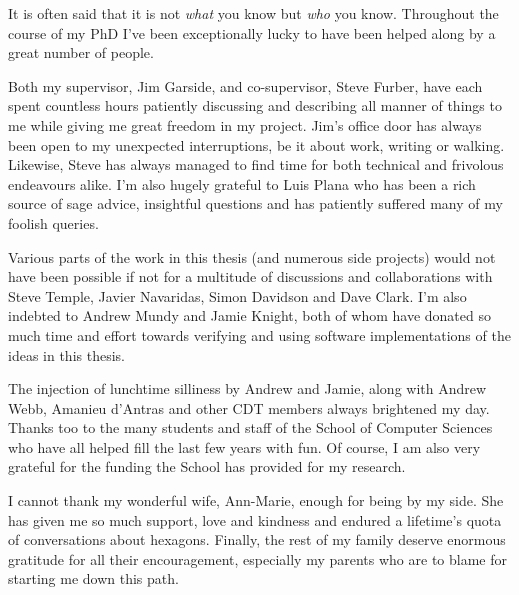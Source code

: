 {
	
	
	It is often said that it is not \emph{what} you know but \emph{who} you know.
	Throughout the course of my PhD I've been exceptionally lucky to have been
	helped along by a great number of people.
	
	Both my supervisor, Jim Garside, and co-supervisor, Steve Furber, have each
	spent countless hours patiently discussing and describing all manner of
	things to me while giving me great freedom in my project. Jim's office door
	has always been open to my unexpected interruptions, be it about work, writing
	or walking.  Likewise, Steve has always managed to find time for both
	technical and frivolous endeavours alike. I'm also hugely grateful to Luis
	Plana who has been a rich source of sage advice, insightful questions and has
	patiently suffered many of my foolish queries.
	
	Various parts of the work in this thesis (and numerous side projects) would
	not have been possible if not for a multitude of discussions and
	collaborations with Steve Temple, Javier Navaridas, Simon Davidson and Dave
	Clark. I'm also indebted to Andrew Mundy and Jamie Knight, both of whom have
	donated so much time and effort towards verifying and using software
	implementations of the ideas in this thesis.
	
	The injection of lunchtime silliness by Andrew and Jamie, along with Andrew
	Webb, Amanieu d'Antras and other CDT members always brightened my day.
	Thanks too to the many students and staff of the School of Computer Sciences
	who have all helped fill the last few years with fun. Of course, I am also
	very grateful for the funding the School has provided for my research.
	
	I cannot thank my wonderful wife, Ann-Marie, enough for being by my side. She
	has given me so much support, love and kindness and endured a lifetime's
	quota of conversations about hexagons. Finally, the rest of my family deserve
	enormous gratitude for all their encouragement, especially my parents who are
	to blame for starting me down this path.
	
	\par%
}
